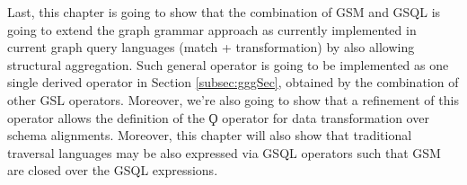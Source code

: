 Last, this chapter is going to show that the combination of GSM and GSQL is going to extend the graph grammar approach as currently implemented in current graph query languages (match + transformation) by also allowing structural aggregation. Such general operator is going to be implemented as one single derived operator in Section \ref{subsec:gggSec}, obtained by the combination of other GSL operators. Moreover, we're also going to show that a refinement of this operator allows the definition of the $\Qoppa$ operator for data transformation over schema alignments.
Moreover, this chapter will also show that traditional traversal languages may be also  expressed via GSQL operators such that GSM are closed over the GSQL expressions. 
